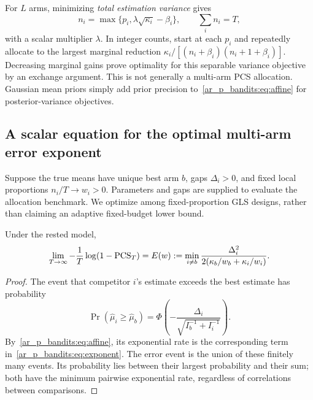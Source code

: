 For $L$ arms, minimizing \emph{total estimation variance} gives
\begin{equation}
n_i=\max\{p_i,\lambda\sqrt{\kappa_i}-\beta_i\},\qquad
\sum_i n_i=T,
\end{equation}
with a scalar multiplier $\lambda$. In integer counts, start at each $p_i$ and repeatedly allocate to the largest marginal reduction
$\kappa_i/[(n_i+\beta_i)(n_i+1+\beta_i)]$. Decreasing marginal gains prove optimality for this separable variance objective by an exchange argument. This is not generally a multi-arm PCS allocation. Gaussian mean priors simply add prior precision to~\eqref{ar_p_bandits:eq:affine} for posterior-variance objectives.

\subsection{A scalar equation for the optimal multi-arm error exponent}
Suppose the true means have unique best arm $b$, gaps $\Delta_i>0$, and fixed local proportions $n_i/T\to w_i>0$. Parameters and gaps are supplied to evaluate the allocation benchmark. We optimize among fixed-proportion GLS designs, rather than claiming an adaptive fixed-budget lower bound.

\begin{theorem}
Under the rested model,
\begin{equation}
\lim_{T\to\infty}-\frac1T\log(1-\operatorname{PCS}_T)
=E(w):=\min_{i\ne b}\frac{\Delta_i^2}
{2(\kappa_b/w_b+\kappa_i/w_i)}.
\label{ar_p_bandits:eq:exponent}
\end{equation}
\end{theorem}
\begin{proof}
The event that competitor $i$'s estimate exceeds the best estimate has probability
\[
\Pr(\widehat\mu_i\geq\widehat\mu_b)
=\Phi\left(-\frac{\Delta_i}{\sqrt{I_b^{-1}+I_i^{-1}}}\right).
\]
By~\eqref{ar_p_bandits:eq:affine}, its exponential rate is the corresponding term in~\eqref{ar_p_bandits:eq:exponent}. The error event is the union of these finitely many events. Its probability lies between their largest probability and their sum; both have the minimum pairwise exponential rate, regardless of correlations between comparisons.
\end{proof}

